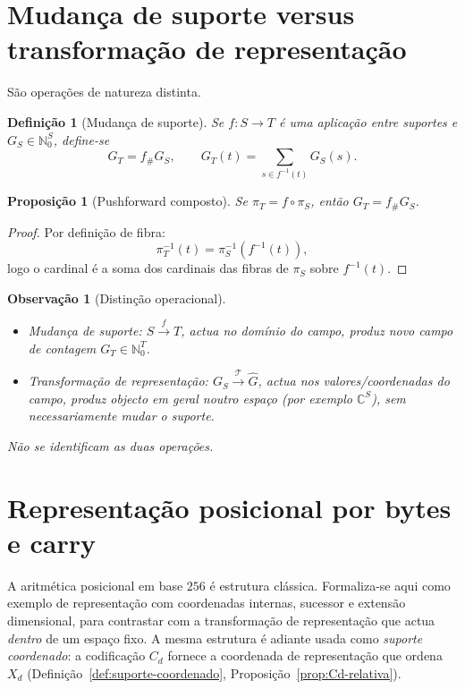 \documentclass[11pt,a4paper]{article}
\newtheorem{definicao}{Definição}
\newtheorem{proposicao}{Proposição}
\newtheorem{observacao}{Observação}
\begin{document}
\section{Mudança de suporte versus transformação de representação}

São operações de natureza distinta.

\begin{definicao}[Mudança de suporte]
Se \(f\colon S\to T\) é uma aplicação entre suportes e \(G_S\in\mathbb N_0^S\), define-se
\[
G_T=f_{\#}G_S,\qquad
G_T(t)=\sum_{s\in f^{-1}(t)}G_S(s).
\]
\end{definicao}

\begin{proposicao}[Pushforward composto]
Se \(\pi_T=f\circ\pi_S\), então \(G_T=f_{\#}G_S\).
\end{proposicao}

\begin{proof}
Por definição de fibra:
\[
\pi_T^{-1}(t)=\pi_S^{-1}(f^{-1}(t)),
\]
logo o cardinal é a soma dos cardinais das fibras de \(\pi_S\) sobre \(f^{-1}(t)\).
\end{proof}

\begin{observacao}[Distinção operacional]
\begin{itemize}[leftmargin=1.5em]
\item Mudança de suporte: \(S\xrightarrow{f}T\), actua no domínio do campo, produz novo campo de contagem \(G_T\in\mathbb N_0^T\).
\item Transformação de representação: \(G_S\xrightarrow{\mathcal T}\widehat G\), actua nos valores/coordenadas do campo, produz objecto em geral noutro espaço (por exemplo \(\mathbb C^S\)), sem necessariamente mudar o suporte.
\end{itemize}
Não se identificam as duas operações.
\end{observacao}

\section{Representação posicional por bytes e carry}
\label{sec:byte-carry}

A aritmética posicional em base \(256\) é estrutura clássica. Formaliza-se aqui como exemplo de representação com coordenadas internas, sucessor e extensão dimensional, para contrastar com a transformação de representação que actua \emph{dentro} de um espaço fixo. A mesma estrutura é adiante usada como \emph{suporte coordenado}: a codificação \(C_d\) fornece a coordenada de representação que ordena \(X_d\) (Definição~\ref{def:suporte-coordenado}, Proposição~\ref{prop:Cd-relativa}).
\end{document}
